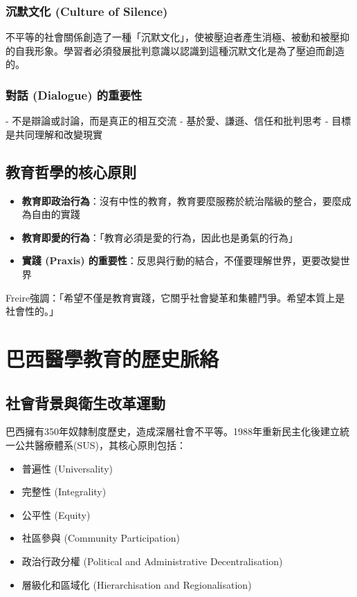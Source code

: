 \documentclass[12pt,a4paper]{article}
\newcommand{\note}[1]{
    \par
    \noindent
    \begin{tcolorbox}[
        colback=brazil_blue!5!white,
        colframe=brazil_blue,
        title=\textbf{重點提醒},
        fonttitle=\bfseries,
        boxrule=0.5pt,
        arc=3pt,
        left=6pt,
        right=6pt,
        top=6pt,
        bottom=6pt
    ]
    #1
    \end{tcolorbox}
}
\begin{document}
\subsubsection{沉默文化 (Culture of Silence)}
不平等的社會關係創造了一種「沉默文化」，使被壓迫者產生消極、被動和被壓抑的自我形象。學習者必須發展批判意識以認識到這種沉默文化是為了壓迫而創造的。

\subsubsection{對話 (Dialogue) 的重要性}
- 不是辯論或討論，而是真正的相互交流
- 基於愛、謙遜、信任和批判思考
- 目標是共同理解和改變現實

\subsection{教育哲學的核心原則}

\begin{itemize}[nosep]
    \item \textbf{教育即政治行為}：沒有中性的教育，教育要麼服務於統治階級的整合，要麼成為自由的實踐
    \item \textbf{教育即愛的行為}：「教育必須是愛的行為，因此也是勇氣的行為」
    \item \textbf{實踐 (Praxis) 的重要性}：反思與行動的結合，不僅要理解世界，更要改變世界
\end{itemize}

\vspace{0.5cm}
\note{
Freire強調：「希望不僅是教育實踐，它關乎社會變革和集體鬥爭。希望本質上是社會性的。」
}

\section{巴西醫學教育的歷史脈絡}

\subsection{社會背景與衛生改革運動}
巴西擁有350年奴隸制度歷史，造成深層社會不平等。1988年重新民主化後建立統一公共醫療體系(SUS)，其核心原則包括：
\begin{itemize}[nosep]
    \item 普遍性 (Universality)
    \item 完整性 (Integrality)
    \item 公平性 (Equity)
    \item 社區參與 (Community Participation)
    \item 政治行政分權 (Political and Administrative Decentralisation)
    \item 層級化和區域化 (Hierarchisation and Regionalisation)
\end{itemize}
\end{document}
